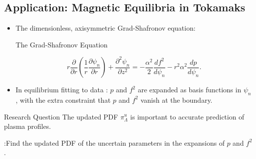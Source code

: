 \documentclass[11pt]{beamer}
\begin{document}
\subsection{Application: Magnetic Equilibria in Tokamaks}

\begin{frame}

	\begin{itemize}
	

	\item The dimensionless, axisymmetric  Grad-Shafronov equation: %
	
	\begin{block}{The Grad-Shafronov Equation \footnotemark[1]}

\begin{equation}
r\frac{\partial}{\partial r} \left( \frac{1}{r} \frac{\partial\psi_n}{\partial r} \right) + \frac{\partial^2 \psi_n}{\partial z^2} = -\frac{\alpha^2}{2} \frac{d f^2}{d \psi_n} - r^2\alpha^2 \frac{dp}{d\psi_n}.
\end{equation}

	\end{block}


	\item In equilibrium fitting to data \footnotemark[2]: $p$ and $f^2$ are expanded as basis functions  in $\psi_n$, with the extra constraint that $p$ and $f^2$ vanish at the boundary.
	\end{itemize}

\begin{block}{Research Question}
The updated  PDF $\pi^u_\Lambda$ is important to accurate prediction of plasma profiles.

:Find the updated PDF of the uncertain parameters in the expansions of $p$ and $f^2$.  
\end{block}



\end{frame}
\end{document}
